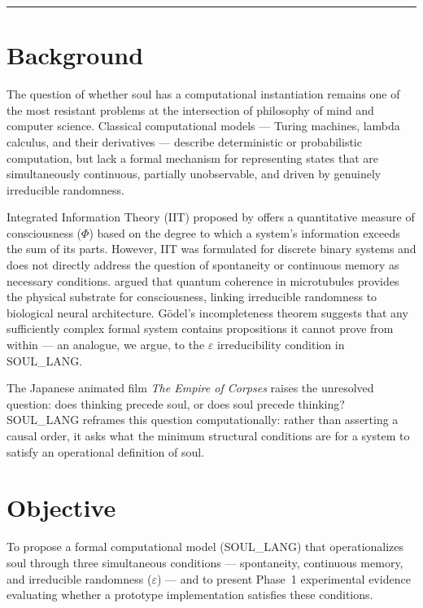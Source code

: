 \documentclass[11pt,a4paper]{article}
\begin{document}
\hrule
\vspace{12pt}

\section{Background}

The question of whether soul has a computational instantiation remains one of the most
resistant problems at the intersection of philosophy of mind and computer science.
Classical computational models --- Turing machines, lambda calculus, and their
derivatives --- describe deterministic or probabilistic computation, but lack a formal
mechanism for representing states that are simultaneously continuous, partially
unobservable, and driven by genuinely irreducible randomness.

Integrated Information Theory (IIT) proposed by \citet{tononi2004} offers a
quantitative measure of consciousness ($\Phi$) based on the degree to which a system's
information exceeds the sum of its parts. However, IIT was formulated for discrete
binary systems and does not directly address the question of spontaneity or continuous
memory as necessary conditions. \citet{penrose1996} argued that quantum coherence in
microtubules provides the physical substrate for consciousness, linking irreducible
randomness to biological neural architecture. G\"odel's incompleteness theorem
\citep{godel1931} suggests that any sufficiently complex formal system contains
propositions it cannot prove from within --- an analogue, we argue, to the $\varepsilon$
irreducibility condition in SOUL\_LANG.

The Japanese animated film \textit{The Empire of Corpses} raises the unresolved
question: does thinking precede soul, or does soul precede thinking? SOUL\_LANG
reframes this question computationally: rather than asserting a causal order, it asks
what the minimum structural conditions are for a system to satisfy an operational
definition of soul.

\section{Objective}

To propose a formal computational model (SOUL\_LANG) that operationalizes soul through
three simultaneous conditions --- spontaneity, continuous memory, and irreducible
randomness ($\varepsilon$) --- and to present Phase~1 experimental evidence evaluating
whether a prototype implementation satisfies these conditions.
\end{document}
